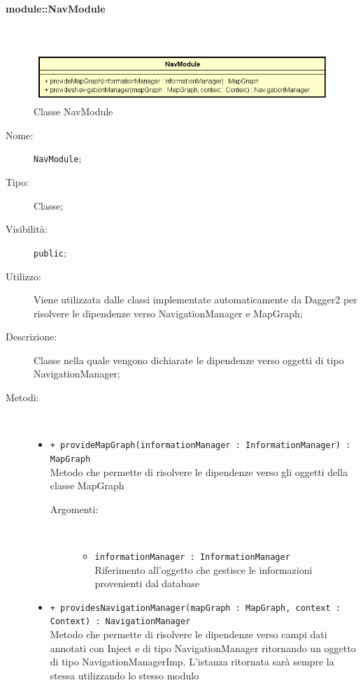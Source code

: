 \documentclass[../DefinizioneDiProdotto.tex]{subfiles}
\begin{document}
\paragraph{module::NavModule}
\
\begin{figure}[H]
	\centering
	\includegraphics[width=\maxwidth]{img/NavModule.png}
	\caption{Classe NavModule}\label{fig:module::NavModule} 
\end{figure}
\begin{description}
	\item[Nome:] \texttt{NavModule};
	\item[Tipo:] Classe;
	\item[Visibilità:] \texttt{public};
	\item[Utilizzo:] Viene utilizzata dalle classi implementate automaticamente da Dagger2 per risolvere le dipendenze verso NavigationManager e MapGraph;
	\item[Descrizione:] Classe nella quale vengono dichiarate le dipendenze verso oggetti di tipo NavigationManager;
	\item[Metodi:] \
	\begin{itemize}
		\item \texttt{+ provideMapGraph(informationManager : InformationManager) : MapGraph}\\
		Metodo che permette di risolvere le dipendenze verso gli oggetti della classe MapGraph
		\begin{description}
			\item[Argomenti:] \
			\begin{itemize}
				\item \texttt{informationManager : InformationManager}\\
				Riferimento all'oggetto che gestisce le informazioni provenienti dal database\end{itemize}
		\end{description}
		\item \texttt{+ providesNavigationManager(mapGraph : MapGraph, context : Context) : NavigationManager}\\
		Metodo che permette di risolvere le dipendenze verso campi dati annotati con Inject e di tipo NavigationManager ritornando un oggetto di tipo NavigationManagerImp. L'istanza ritornata sarà sempre la stessa utilizzando lo stesso modulo

\end{itemize}
\end{description}
\end{document}

